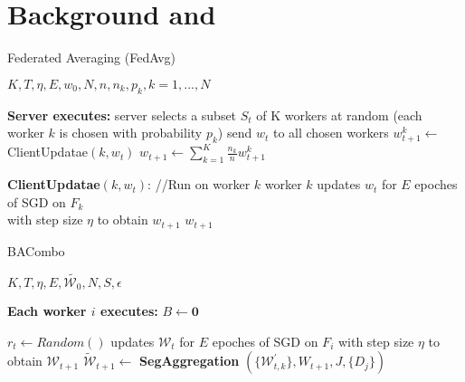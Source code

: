 \section{Background and }


\begin{algorithm}[!t]

\caption{Federated Averaging (FedAvg)}

\renewcommand{\algorithmicrequire}{\textbf{Input:}}
\renewcommand{\algorithmicensure}{\textbf{Output:}}

\begin{algorithmic}[1]
\REQUIRE $K, T, \eta, E, w_0, N, n, n_k, p_k,  k = 1,...,N $

\STATE \textbf{Server executes:}
    \STATE server selects a subset $S_t$ of K workers at random (each worker $k$ is chosen with probability $p_k$)
    \STATE send $w_t$ to all chosen workers
        \STATE $w^k_{t+1} \leftarrow$ ClientUpdatae$(k,w_{t})$
    \ENDFOR
    \STATE $w_{t+1} \leftarrow \sum ^{K}_{k=1} \frac{n_k}{n}w^k_{t+1}$
\ENDFOR
\item[]


\STATE \textbf{ClientUpdatae}$(k,w_{t})$: //Run on worker $k$
\STATE \quad worker $k$ updates $w_t$ for $E$ epoches of SGD on $F_k$ \\ \quad with step size $\eta$ to obtain $w_{t+1}$
\RETURN $w_{t+1}$ 

\end{algorithmic}	\label{Fedavg} 
\end{algorithm}




\begin{algorithm}[!t]

\caption{BACombo}

\renewcommand{\algorithmicrequire}{\textbf{Input:}}
\renewcommand{\algorithmicensure}{\textbf{Output:}}

\begin{algorithmic}[1]
\REQUIRE $K, T, \eta, E, \widetilde{\mathcal{W}_{0}}, N, S, \epsilon $

\STATE \textbf{Each worker $i$ executes:}
\STATE $ B \leftarrow \mathbf{0} $

    \STATE $r_t \leftarrow Random()$ 
    \STATE updates ${\mathcal W}_{t}$ for $E$ epoches of SGD on $F_i$  with step size $\eta$ to obtain ${\mathcal W}_{t+1}$
    \ENDIF
    \STATE $\widetilde{\mathcal{W}}_{t+1} \leftarrow$ \textbf{SegAggregation} $(\{\mathcal{W}_{t,k}^\prime\},{{W}}_{t+1},J ,\{D_j\})$
\ENDFOR
\item[]

\end{algorithmic}	\label{Fedavg} 
\end{algorithm}

